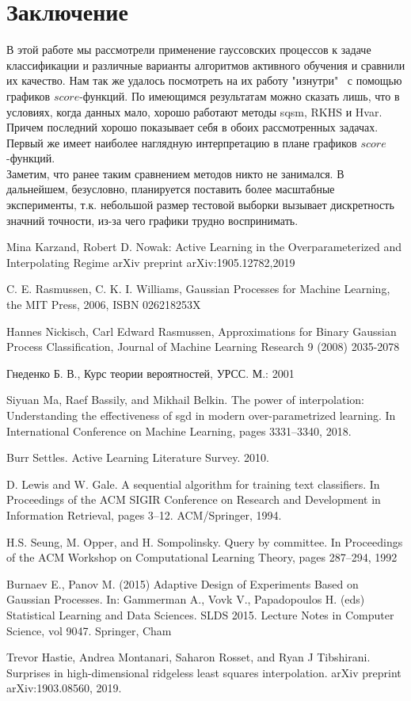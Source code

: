 \documentclass{llncs}
\begin{document}
\section{Заключение}
В этой работе мы рассмотрели применение гауссовских процессов к задаче классификации и различные варианты алгоритмов активного обучения и сравнили их качество. Нам так же удалось посмотреть на их работу "изнутри" \ с помощью графиков $score$-функций. По имеющимся результатам можно сказать лишь, что в условиях, когда данных мало, хорошо работают методы sqsm, RKHS и Hvar. Причем последний хорошо показывает себя в обоих рассмотренных задачах. Первый же имеет наиболее наглядную интерпретацию в плане графиков $score$-функций.\\
Заметим, что ранее таким сравнением методов никто не занимался. В дальнейшем, безусловно, планируется поставить более масштабные эксперименты, т.к. небольшой размер тестовой выборки вызывает дискретность значний точности, из-за чего графики трудно воспринимать.
\begin{thebibliography}{}

Mina Karzand, Robert D. Nowak:
Active Learning in the Overparameterized
and Interpolating Regime
arXiv preprint arXiv:1905.12782,2019

C. E. Rasmussen, C. K. I. Williams, 
Gaussian Processes for Machine Learning, 
the MIT Press, 2006, ISBN 026218253X

Hannes Nickisch, Carl Edward Rasmussen, 
Approximations for Binary Gaussian Process Classification, 
Journal of Machine Learning Research 9 (2008) 2035-2078 

Гнеденко Б. В., 
Курс теории вероятностей, 
УРСС. М.: 2001

Siyuan Ma, Raef Bassily, and Mikhail Belkin. 
The power of interpolation: Understanding the effectiveness of sgd in modern over-parametrized learning. 
In International Conference on Machine Learning, pages 3331–3340, 2018.

Burr Settles. 
Active Learning Literature Survey.  
2010.

D. Lewis and W. Gale. 
A sequential algorithm for training text classifiers. 
In Proceedings of the ACM SIGIR Conference on Research and Development in Information Retrieval, 
pages 3–12. ACM/Springer, 1994.

H.S. Seung, M. Opper, and H. Sompolinsky. 
Query by committee. In Proceedings of the ACM Workshop on Computational Learning Theory,
pages 287–294, 1992

Burnaev E., Panov M. (2015) 
Adaptive Design of Experiments Based on Gaussian Processes. In: Gammerman A., Vovk V., Papadopoulos H. (eds) Statistical Learning and Data Sciences. SLDS 2015. 
Lecture Notes in Computer Science, vol 9047. Springer, Cham


Trevor Hastie, Andrea Montanari, Saharon Rosset, and Ryan J Tibshirani. 
Surprises in high-dimensional ridgeless least squares interpolation. 
arXiv preprint arXiv:1903.08560, 2019.

\end{thebibliography}
\end{document}
